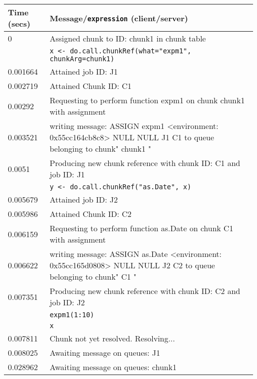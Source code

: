 \begin{table}
	\def\clientcolour{mybrown}
	\def\servercolour{mynavy}
	\centering
	\begin{tabularx}{\textwidth}{lX}
		\toprule
		Time (secs)  & Message/\texttt{expression} (\textcolor{\clientcolour}{client}/\textcolor{\servercolour}{server}) \\
		\midrule
		0        & \textcolor{\servercolour}{Assigned chunk to ID: chunk1 in chunk table} \\
			 & \textcolor{\clientcolour}{\texttt{x <- do.call.chunkRef(what="expm1", chunkArg=chunk1)} } \\
		0.001664 & \textcolor{\clientcolour}{Attained job ID:  J1} \\
		0.002719 & \textcolor{\clientcolour}{Attained Chunk ID:  C1} \\
		0.00292  & \textcolor{\clientcolour}{Requesting to perform function expm1 on chunk chunk1 with assignment} \\
		0.003521 & \textcolor{\clientcolour}{writing message: ASSIGN expm1 <environment: 0x55cc164cb8c8> NULL NULL J1 C1 to queue belonging to chunk" chunk1 "} \\
		0.0051   & \textcolor{\clientcolour}{Producing new chunk reference with chunk ID: C1 and job ID: J1} \\
			 & \textcolor{\clientcolour}{\texttt{y <- do.call.chunkRef("as.Date", x)}} \\
		0.005679 & \textcolor{\clientcolour}{Attained job ID:  J2} \\
		0.005986 & \textcolor{\clientcolour}{Attained Chunk ID:  C2} \\
		0.006159 & \textcolor{\clientcolour}{Requesting to perform function as.Date on chunk C1 with assignment} \\
		0.006622 & \textcolor{\clientcolour}{writing message: ASSIGN as.Date <environment: 0x55cc165d0808> NULL NULL J2 C2 to queue belonging to chunk" C1 "} \\
		0.007351 & \textcolor{\clientcolour}{Producing new chunk reference with chunk ID: C2 and job ID: J2} \\
			 & \textcolor{\clientcolour}{\texttt{expm1(1:10)}} \\
			 & \textcolor{\clientcolour}{\texttt{x}} \\
		0.007811 & \textcolor{\clientcolour}{Chunk not yet resolved. Resolving...} \\
		0.008025 & \textcolor{\clientcolour}{Awaiting message on queues: J1} \\
		0.028962 & \textcolor{\servercolour}{Awaiting message on queues: chunk1} \\

\end{tabularx}
\end{table}
